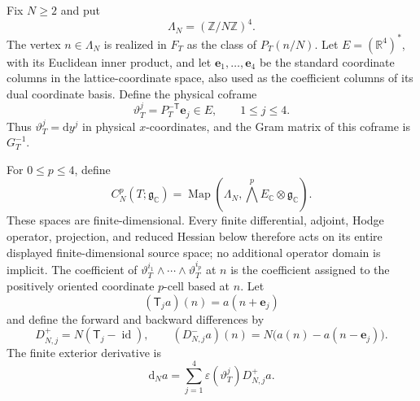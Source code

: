 Fix \(N\ge2\) and put
\[
 \Lambda_N=(\mathbb Z/N\mathbb Z)^4.
\]
The vertex \(n\in\Lambda_N\) is realized in \(F_T\) as the class of
\(P_T(n/N)\).  Let \(E=(\mathbb R^4)^*\), with its Euclidean inner product,
and let \(\mathbf e_1,\ldots,\mathbf e_4\) be the standard coordinate
columns in the lattice-coordinate space, also used as the coefficient
columns of its dual coordinate basis.  Define the physical coframe
\begin{equation}
 \vartheta_T^j=P_T^{-\mathsf T}\mathbf e_j\in E,
 \qquad 1\le j\le4.
 \label{cusp-gauge-finite-physical-coframe}
\end{equation}
Thus \(\vartheta_T^j=\mathrm dy^j\) in physical \(x\)-coordinates, and the
Gram matrix of this coframe is \(G_T^{-1}\).

For \(0\le p\le4\), define
\begin{equation}
 C_N^p(T;\mathfrak g_{\mathbb C})
 =\operatorname{Map}\left(
   \Lambda_N,\bigwedge^pE_{\mathbb C}\otimes\mathfrak g_{\mathbb C}
  \right).
 \label{cusp-gauge-finite-cochain-spaces}
\end{equation}
These spaces are finite-dimensional.  Every finite differential, adjoint,
Hodge operator, projection, and reduced Hessian below therefore acts on its
entire displayed finite-dimensional source space; no additional operator
domain is implicit.
The coefficient of
\(\vartheta_T^{i_1}\wedge\cdots\wedge\vartheta_T^{i_p}\) at \(n\) is the
coefficient assigned to the positively oriented coordinate \(p\)-cell
based at \(n\).  Let
\[
 (\mathsf T_ja)(n)=a(n+\mathbf e_j)
\]
and define the forward and backward differences by
\begin{equation}
 D_{N,j}^+=N(\mathsf T_j-\operatorname{id}),\qquad
 (D_{N,j}^-a)(n)
 =N\bigl(a(n)-a(n-\mathbf e_j)\bigr).
 \label{cusp-gauge-finite-differences}
\end{equation}
The finite exterior derivative is
\begin{equation}
 \mathrm d_Na
 =\sum_{j=1}^4
   \varepsilon(\vartheta_T^j)D_{N,j}^+a.
 \label{cusp-gauge-finite-exterior-derivative}
\end{equation}

